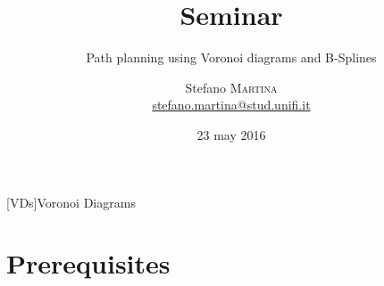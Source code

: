 





\title[Seminar]{\textbf{Seminar}}
\date[23 may 2016]{23 may 2016}
\subtitle{Path planning using Voronoi diagrams and B-Splines}

\author[Martina Stefano]{
  \begin{center}
    \begin{tabular}{lr}
      Stefano \textsc{Martina}\\
      \href{mailto:stefano.martina@stud.unifi.it}{stefano.martina@stud.unifi.it}\\
    \end{tabular}
  \end{center}
}



[VDs]{Voronoi Diagrams}

\begin{frame}[plain]
  \titlepage
\end{frame}

\section{Prerequisites}

